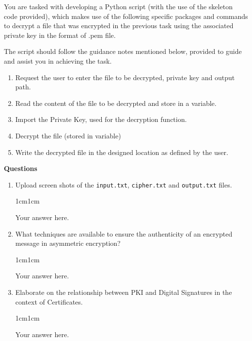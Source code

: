 \documentclass[11pt,letterpaper]{article}
\newenvironment{answer}{\em \color{blue} \begin{adjustwidth}{1cm}{1cm}}{\end{adjustwidth}}
\begin{document}
\medskip
You are tasked with developing a Python script (with the use of the skeleton code provided), which makes use of the following specific packages and commands to decrypt a file that was encrypted in the previous task using the associated private key in the format of .pem file.  

\medskip
The script should follow the guidance notes mentioned below, provided to guide and assist you in achieving the task.

\begin{enumerate}
    \item Request the user to enter the file to be decrypted, private key and output path. 
    \item Read the content of the file to be decrypted and store in a variable. 
    \item Import the Private Key, used for the decryption function. 
    \item Decrypt the file (stored in variable) 
    \item Write the decrypted file in the designed location as defined by the user.

\end{enumerate}

\noindent \textbf{Questions}
\medskip
\begin{enumerate}
    \item Upload screen shots of the \texttt{input.txt}, \texttt{cipher.txt} and \texttt{output.txt} files.
        \begin{answer}
	
		Your answer here.
		
	\end{answer}
    \item What techniques are available to ensure the authenticity of an encrypted message in asymmetric encryption?
        \begin{answer}
	
		Your answer here.
		
	\end{answer}
    \item Elaborate on the relationship between PKI and Digital Signatures in the context of Certificates. 
        \begin{answer}
	
		Your answer here.
		
	\end{answer}
\end{enumerate}
\end{document}
